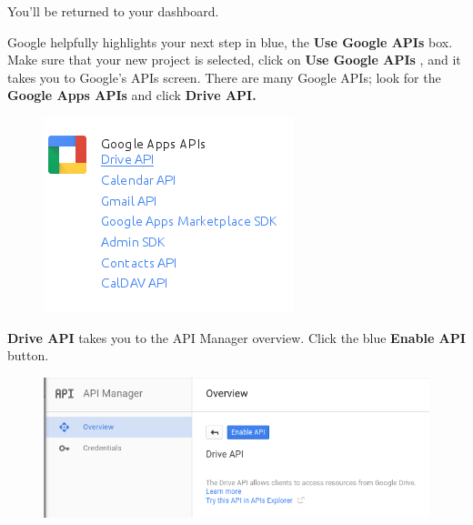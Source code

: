 \documentclass[letterpaper,10pt,english]{sphinxmanual}
\begin{document}
You'll be returned to your dashboard.
\begin{figure}[htbp]
\centering

\end{figure}

Google helpfully highlights your next step in blue, the \textbf{Use Google APIs}
box. Make sure that your new project is selected, click on \textbf{Use Google APIs} ,
and it takes you to Google's APIs screen. There are many Google APIs; look for
the \textbf{Google Apps APIs} and click \textbf{Drive API.}
\begin{figure}[htbp]
\centering

\includegraphics{google-drive3.png}
\end{figure}

\textbf{Drive API} takes you to the API Manager overview. Click the blue \textbf{Enable
API} button.
\begin{figure}[htbp]
\centering

\includegraphics{google-drive4.png}
\end{figure}
\end{document}
